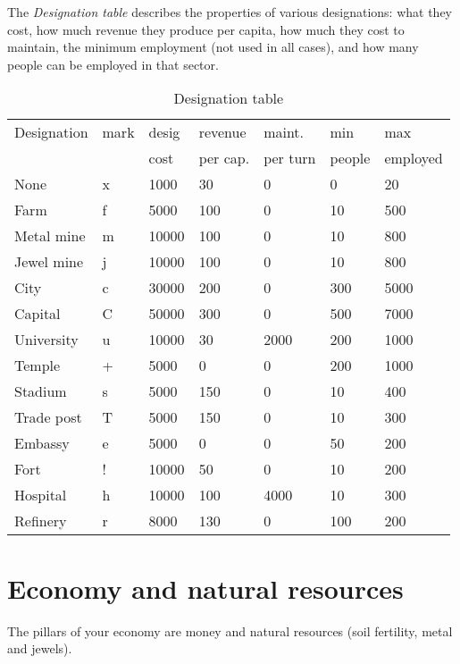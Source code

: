 The \emph{Designation table} describes the properties of various
designations: what they cost, how much revenue they produce per
capita, how much they cost to maintain, the minimum employment (not
used in all cases), and how many people can be employed in that
sector.
\begin{same}
\begin{table}[hbpt]
\caption{Designation table}
\begin{tabular}{ || l | l | l | l | l | l | l || }
\hline
Designation &mark&desig& revenue & maint. & min  &  max    \\
            &    &cost & per cap.&per turn&people&employed \\
\hline
None        &  x & 1000 &   30    &    0   &    0 &   20 \\
Farm        &  f & 5000 &  100    &    0   &   10 &  500 \\
Metal mine  &  m &10000 &  100    &    0   &   10 &  800 \\
Jewel mine  &  j &10000 &  100    &    0   &   10 &  800 \\
City        &  c &30000 &  200    &    0   &  300 & 5000 \\
Capital     &  C &50000 &  300    &    0   &  500 & 7000 \\
University  &  u &10000 &   30    & 2000   &  200 & 1000 \\
Temple      &  + & 5000 &    0    &    0   &  200 & 1000 \\
Stadium     &  s & 5000 &  150    &    0   &   10 &  400 \\
Trade post  &  T & 5000 &  150    &    0   &   10 &  300 \\
Embassy     &  e & 5000 &    0    &    0   &   50 &  200 \\
Fort        &  ! &10000 &   50    &    0   &   10 &  200 \\
Hospital    &  h &10000 &  100    & 4000   &   10 &  300 \\
Refinery    &  r & 8000 &  130    &    0   &  100 &  200 \\
\hline
\end{tabular}
\end{table}
\end{same}

\section{Economy and natural resources}
The pillars of your economy are money and natural resources (soil
fertility, metal and jewels).

